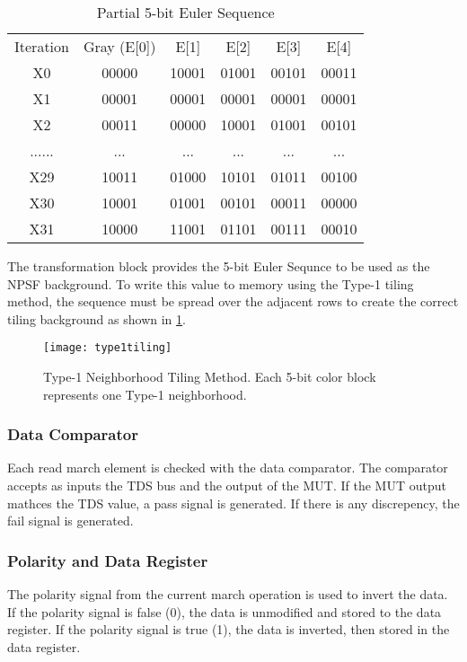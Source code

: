 \begin{table}[h]
  \caption{Partial 5-bit Euler Sequence}
  \centering
  \begin{tabular}{c c c c c c}
  \hline\hline
  Iteration    & Gray (E[0]) & E[1]  & E[2]  & E[3]  & E[4]  \\
  X0  & 00000 & 10001 & 01001 & 00101 & 00011 \\
  X1  & 00001 & 00001 & 00001 & 00001 & 00001 \\
  X2  & 00011 & 00000 & 10001 & 01001 & 00101 \\
  ......             & ...   & ...   & ...   & ...   & ...   \\
  X29 & 10011 & 01000 & 10101 & 01011 & 00100 \\
  X30 & 10001 & 01001 & 00101 & 00011 & 00000 \\
  X31 & 10000 & 11001 & 01101 & 00111 & 00010 \\ [0.5ex]
  \end{tabular}
  \label{tab:euler}
\end{table}

The transformation block provides the 5-bit Euler Sequnce to be used as the NPSF background.  To write this value to memory using the Type-1 tiling method, the sequence must be spread over the adjacent rows to create the correct tiling background as shown in \ref{fig:tiling}.  

\begin{figure}[h!]
  \centering
  \texttt{[image: type1tiling]}
  \caption{Type-1 Neighborhood Tiling Method.  Each 5-bit color block represents one Type-1 neighborhood.}
  \label{fig:tiling}
\end{figure}

\subsubsection{Data Comparator}
Each read march element is checked with the data comparator.  The comparator accepts as inputs the TDS bus and the output of the MUT.  If the MUT output mathces the TDS value, a pass signal is generated.  If there is any discrepency, the fail signal is generated.  

\subsubsection{Polarity and Data Register}
The polarity signal from the current march operation is used to invert the data.  If the polarity signal is false (0), the data is unmodified and stored to the data register.  If the polarity signal is true (1), the data is inverted, then stored in the data register.  

